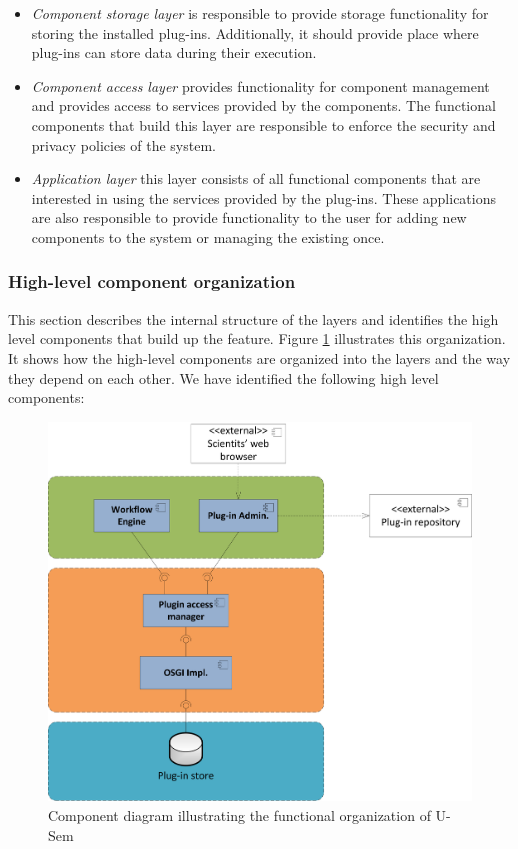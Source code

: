\begin{itemize}
	\item \textit{Component storage layer} is responsible to provide storage functionality for storing the installed plug-ins. Additionally, it should provide place where plug-ins can store data during their execution.
	\item \textit{Component access layer} provides functionality for component management and provides access to services provided by the components. The functional components that build this layer are responsible to enforce the security and privacy policies of the system.
	\item \textit{Application layer} this layer consists of all functional components that are interested in using the services provided by the plug-ins. These applications are also responsible to provide functionality to the user for adding new components to the system or managing the existing once. 
	\end{itemize}

\subsubsection{High-level component organization}

This section describes the internal structure of the layers and identifies the high level components that build up the feature. Figure \ref{fig_comp} illustrates this organization. It shows how the high-level components are organized into the layers and the way they depend on each other. We have identified the following high level components:

\begin{figure}[h!]
  \centering
  	\includegraphics[scale=0.6]{plug-in/layers/main-func.png}
  \caption{Component diagram illustrating the functional organization of U-Sem}
  \label{fig_comp}
\end{figure}

